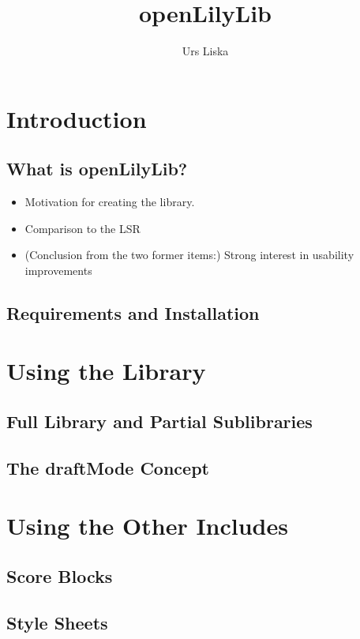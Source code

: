 \documentclass{OLLbook}
\title{openLilyLib}
\author{Urs Liska}
\begin{document}
\maketitle
\tableofcontents

\chapter{Introduction}

\section{What is openLilyLib?}
\begin{itemize}
\item Motivation for creating the library.
\item Comparison to the LSR
\item (Conclusion from the two former items:) Strong interest in usability improvements
\end{itemize}

\section{Requirements and Installation}


\chapter{Using the Library}

\section{Full Library and Partial Sublibraries}

\section{The draftMode Concept}




\chapter{Using the Other Includes}

\section{Score Blocks}

\section{Style Sheets}
\end{document}
